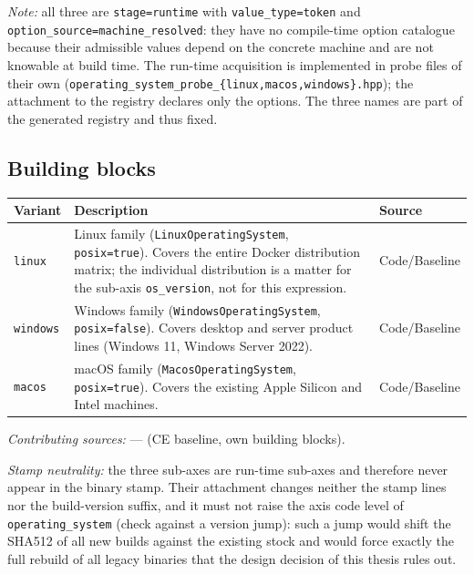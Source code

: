 \emph{Note:} all three are \texttt{stage=\allowbreak{}runtime} with \texttt{value\_\allowbreak{}type=\allowbreak{}token} and \texttt{option\_\allowbreak{}source=\allowbreak{}machine\_\allowbreak{}resolved}: they have no compile-time option catalogue because their admissible values depend on the concrete machine and are not knowable at build time. The run-time acquisition is implemented in probe files of their own (\texttt{operating\_\allowbreak{}system\_\allowbreak{}probe\_\allowbreak{}\{linux,\allowbreak{}macos,\allowbreak{}windows\}.hpp}); the attachment to the registry declares only the options. The three names are part of the generated registry and thus fixed.

\subsection*{Building blocks}

\begin{scriptsize}
\begin{longtable}{@{}>{\raggedright\arraybackslash}p{2.4cm} >{\raggedright\arraybackslash}p{7.6cm} >{\raggedright\arraybackslash}p{3.5cm}@{}}
\toprule
Variant & Description & Source \\
\midrule
\endhead%
\texttt{linux} & Linux family (\texttt{Linux\allowbreak{}Operating\allowbreak{}System}, \texttt{posix=true}). Covers the entire Docker distribution matrix; the individual distribution is a matter for the sub-axis \texttt{os\_\allowbreak{}version}, not for this expression. & Code/\allowbreak{}Baseline \\
\texttt{windows} & Windows family (\texttt{Windows\allowbreak{}Operating\allowbreak{}System}, \texttt{posix=false}). Covers desktop and server product lines (Windows 11, Windows Server 2022). & Code/\allowbreak{}Baseline \\
\texttt{macos} & macOS family (\texttt{Macos\allowbreak{}Operating\allowbreak{}System}, \texttt{posix=true}). Covers the existing Apple Silicon and Intel machines. & Code/\allowbreak{}Baseline \\
\bottomrule
\end{longtable}
\end{scriptsize}

\emph{Contributing sources:} --- (CE baseline, own building blocks).

\emph{Stamp neutrality:} the three sub-axes are run-time sub-axes and therefore never appear in the binary stamp. Their attachment changes neither the stamp lines nor the build-version suffix, and it must not raise the axis code level of \texttt{operating\_\allowbreak{}system} (check against a version jump): such a jump would shift the SHA512 of all new builds against the existing stock and would force exactly the full rebuild of all legacy binaries that the design decision of this thesis rules out.

